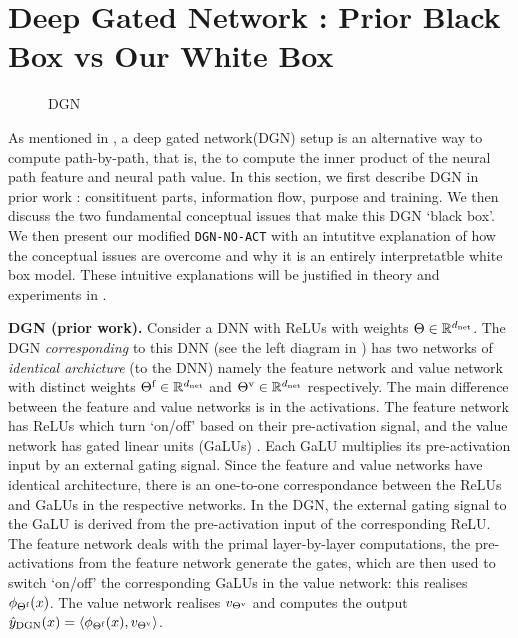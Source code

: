 \section{Deep Gated Network : Prior Black Box vs Our White Box}\label{sec:dgn}
\begin{figure}
\centering
\begin{minipage}{0.8\columnwidth}
\begin{minipage}{0.49\columnwidth}
\resizebox{0.99\columnwidth}{!}{

}
\end{minipage}
\begin{minipage}{0.49\columnwidth}
\resizebox{0.99\columnwidth}{!}{

}
\end{minipage}
\end{minipage}
\caption{DGN}
\label{fig:dgn}
\end{figure}

As mentioned in , a deep gated network(DGN) setup is an alternative way to compute path-by-path, that is, the to compute the inner product of the neural path feature and neural path value. In this section, we first describe DGN in prior work \citep{npk}:  consitituent parts, information flow, purpose and training. We then discuss the two fundamental conceptual issues that make this DGN `black box'. We then present our modified \texttt{DGN-NO-ACT} with an intutitve explanation of how the conceptual issues are overcome and  why it is an entirely interpretatble white box model. These intuitive explanations will be justified in theory and experiments in .

\textbf{DGN (prior work).} Consider a DNN with ReLUs with weights $\Theta\in\mathbb{R}^{d_{\text{net}}}$. The DGN \emph{corresponding} to this DNN (see the left diagram in ) has two networks of \emph{identical archicture} (to the DNN) namely the feature network and value network with distinct weights $\Theta^{\textrm{f}}\in\mathbb{R}^{d_{\text{net}}}$ and ${\Theta}^{\text{v}}\in\mathbb{R}^{d_{\text{net}}}$ respectively. The main difference between the feature and value networks is in the activations. The feature network has ReLUs which turn `on/off' based on their pre-activation signal, and the value  network has gated linear units (GaLUs) \citep{sss,npk}. Each GaLU multiplies its pre-activation input by an external gating signal. Since the feature and value networks have identical architecture, there is an one-to-one correspondance between the ReLUs and GaLUs in the respective networks.
In the DGN, the external gating signal to the GaLU is derived from the pre-activation input of the corresponding ReLU. The feature network deals with the primal layer-by-layer computations, the pre-activations from the feature network generate the gates, which are then used to switch `on/off' the corresponding GaLUs in the value network: this realises $\phi_{\Theta^{\textrm{f}}}(x)$. The value network realises $v_{{\Theta}^{\text{v}}}$ and computes the output $\hat{y}_{\text{DGN}}(x)=\langle \phi_{\Theta^{\textrm{f}}}(x),v_{{\Theta}^{\text{v}}}\rangle$.

